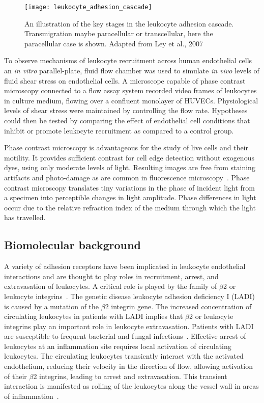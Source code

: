\begin{figure}[htbp!]
	\centering
	\texttt{[image: leukocyte\_adhesion\_cascade]}
	\caption[The leukocyte adhesion cascade]{An illustration of the key stages in the leukocyte adhesion cascade. Transmigration maybe paracellular or transcellular, here the paracellular case is shown. Adapted from Ley et al., 2007~\cite{Ley2007}}
	\label{figure:leukocyte_adhesion_cascade}
\end{figure}

To observe mechanisms of leukocyte recruitment across human endothelial cells an \emph{in vitro} parallel-plate, fluid flow chamber was used to simulate \emph{in vivo} levels of fluid shear stress on endothelial cells. A microscope capable of phase contrast microscopy connected to a flow assay system recorded video frames of leukocytes in culture medium, flowing over a confluent monolayer of HUVECs. Physiological levels of shear stress were maintained by controlling the flow rate. Hypotheses could then be tested by comparing the effect of endothelial cell conditions that inhibit or promote leukocyte recruitment as compared to a control group.

Phase contrast microscopy is advantageous for the study of live cells and their motility. It provides sufficient contrast for cell edge detection without exogenous dyes, using only moderate levels of light. Resulting images are free from staining artifacts and photo-damage as are common in fluorescence microscopy~\cite{Ambuhl2012}. Phase contrast microscopy translates tiny variations in the phase of incident light from a specimen into perceptible changes in light amplitude. Phase differences in light occur due to the relative refraction index of the medium through which the light has travelled.

\subsection{Biomolecular background}
\label{leukocytes:introduction:biomolecular}
A variety of adhesion receptors have been implicated in leukocyte endothelial interactions and are thought to play roles in recruitment, arrest, and extravasation of leukocytes. A critical role is played by the family of $\beta$2 or leukocyte integrins~\cite{Springer1990, Mayadas1993}. The genetic disease leukocyte adhesion deficiency I (LADI) is caused by a mutation of the $\beta$2 integrin gene. The increased concentration of circulating leukocytes in patients with LADI implies that $\beta$2 or leukocyte integrins play an important role in leukocyte extravasation. Patients with LADI are susceptible to frequent bacterial and fungal infections~\cite{Anderson1987}. Effective arrest of leukocytes at an inflammation site requires local activation of circulating leukocytes. The circulating leukocytes transiently interact with the activated endothelium, reducing their velocity in the direction of flow, allowing activation of their $\beta$2 integrins, leading to arrest and extravasation. This transient interaction is manifested as rolling of the leukocytes along the vessel wall in areas of inflammation~\cite{Mayadas1993, Atherton1972}.

